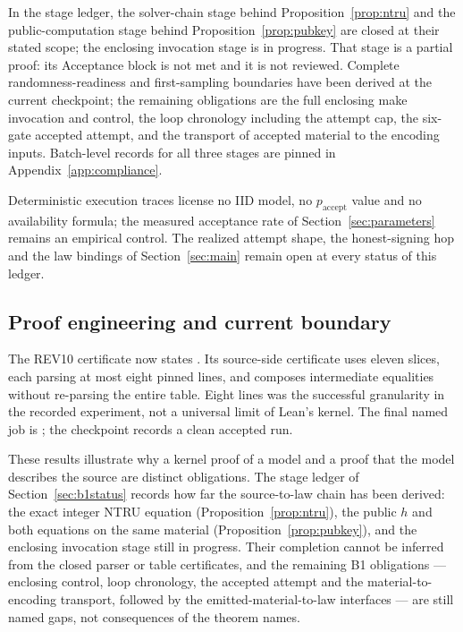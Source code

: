 In the stage ledger, the solver-chain stage behind
Proposition~\ref{prop:ntru} and the public-computation stage behind
Proposition~\ref{prop:pubkey} are closed at their stated scope; the
enclosing invocation stage is in progress. That stage is a partial
proof: its Acceptance block is not met and it is not reviewed.
Complete randomness-readiness and first-sampling boundaries have been
derived at the current checkpoint; the remaining obligations are the
full enclosing make invocation and control, the loop chronology
including the attempt cap, the six-gate accepted attempt, and the
transport of accepted material to the encoding inputs. Batch-level
records for all three stages are pinned in Appendix~\ref{app:compliance}.

Deterministic execution traces license no IID model, no $p_{\mathrm{accept}}$
value and no availability formula; the measured acceptance rate of
Section~\ref{sec:parameters} remains an empirical control. The realized
attempt shape, the honest-signing hop and the law bindings of
Section~\ref{sec:main} remain open at every status of this ledger.

\subsection{Proof engineering and current boundary}
The REV10 certificate now states
.
Its source-side certificate uses eleven slices, each parsing at most
eight pinned lines, and composes intermediate equalities without
re-parsing the entire table. Eight lines was the successful granularity
in the recorded experiment, not a universal limit of Lean's kernel.
The final named job is ; the checkpoint
records a clean accepted run.

These results illustrate why a kernel proof of a model and a proof
that the model describes the source are distinct obligations. The
stage ledger of Section~\ref{sec:b1status} records how far the
source-to-law chain has been derived: the exact integer NTRU equation
(Proposition~\ref{prop:ntru}), the public $h$ and both equations on the
same material (Proposition~\ref{prop:pubkey}), and the enclosing
invocation stage still in progress. Their completion cannot be
inferred from the closed parser or table certificates, and the
remaining B1 obligations --- enclosing control, loop chronology, the
accepted attempt and the material-to-encoding transport, followed by
the emitted-material-to-law interfaces --- are still named gaps, not
consequences of the theorem names.
